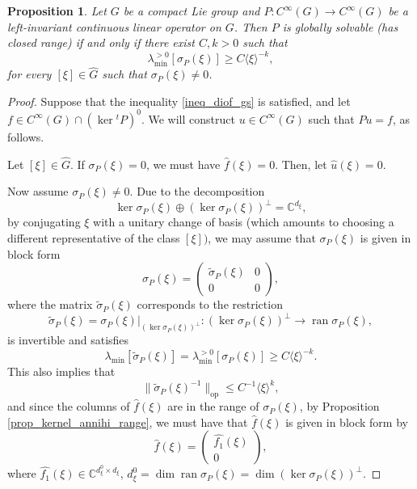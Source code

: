 \documentclass[11pt]{amsart}
\numberwithin{theorem}{section}
\numberwithin{equation}{section}
\newtheorem{prop}[theorem]{Proposition}
\theoremstyle{definition}
\numberwithin{example}{section}
\theoremstyle{definition}
\theoremstyle{definition}
\newcommand{\C}{\mathbb{C}}
\begin{document}
\begin{prop}\label{prop_globally_solvable}
    Let $G$ be a compact Lie group and $P:C^\infty(G)\to C^\infty(G)$ be a left-invariant continuous linear operator on $G$. Then $P$ is globally solvable (has closed range)  if and only if there exist $C,k>0$ such that
    \begin{equation}\label{ineq_diof_gs}
        \lambda_{\min}^{>0}[\sigma_P(\xi)]\geq C\langle \xi\rangle^{-k},
    \end{equation}
    for every $[\xi]\in\widehat{G}$ such that $\sigma_P(\xi)\neq 0$.
\end{prop}
\begin{proof}
Suppose that the inequality \eqref{ineq_diof_gs} is satisfied, and let $f\in C^\infty(G)\cap (\ker {}^tP)^0$.  We will construct $u\in C^\infty(G)$ such that $Pu=f$, as follows.

Let $[\xi]\in\widehat{G}$. If $\sigma_P(\xi)=0$, we must have $\widehat{f}(\xi)=0$. Then, let $\widehat{u}(\xi)=0$. 

Now assume $\sigma_P(\xi)\neq 0$. Due to the decomposition 
\begin{equation*}
    \ker \sigma_P(\xi)\oplus( \ker \sigma_P(\xi))^\perp=\C^{d_\xi},
\end{equation*}
by conjugating $\xi$ with a unitary change of basis (which amounts to choosing a different representative of the class $[\xi])$, we may assume that $\sigma_P(\xi)$ is given in block form
\begin{equation*}
    \sigma_P(\xi)=\begin{pmatrix}
        \tilde \sigma_P(\xi)&0\\
        0&0
    \end{pmatrix},
\end{equation*}
where the matrix $\tilde \sigma_P(\xi)$ corresponds to the restriction
\begin{equation*}
    \tilde \sigma_P(\xi)= \sigma_P(\xi)|_{(\ker \sigma_P(\xi))^\perp}:(\ker \sigma_P(\xi))^\perp\to \operatorname{ran}\sigma_P(\xi),
\end{equation*}
is invertible and satisfies
\begin{equation*}
     \lambda_{\min}[\tilde\sigma_P(\xi)]= \lambda_{\min}^{>0}[\sigma_P(\xi)]\geq C\langle \xi \rangle^{-k}.
\end{equation*}
This also implies that 
\begin{equation*}
    \| \tilde \sigma_P(\xi)^{-1}\|_{\operatorname{op}}\leq C^{-1}\langle \xi \rangle^{k},
\end{equation*}
and since the columns of $\widehat{f}(\xi)$ are in the range of $\sigma_P(\xi)$, by Proposition \ref{prop_kernel_annihi_range}, we must have that $\widehat{f}(\xi)$ is given in block form by
\begin{equation*}
    \widehat{f}(\xi)= \begin{pmatrix}
        {\widehat{f_1}}(\xi)\\0
    \end{pmatrix},
\end{equation*}
where $\widehat{f_1}(\xi)\in\C^{d^0_\xi\times d_\xi}$, $d^0_\xi = \dim \operatorname{ran}\sigma_P(\xi)=\dim (\ker \sigma_P(\xi))^{\perp}$.


\end{proof}
\end{document}
